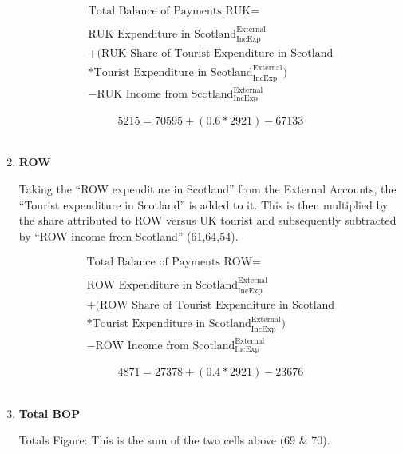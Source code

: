 \begin{enumerate}
\begin{equation}
\begin{split}
\text{Total Balance of Payments RUK} =  \\ \\
\text{RUK Expenditure in Scotland}^\text{External}_\text{IncExp}\\
+(\text{RUK Share of Tourist Expenditure in Scotland}\\
*\text{Tourist  Expenditure in Scotland}^\text{External}_\text{IncExp})\\
-\text{RUK Income from Scotland}^\text{External}_\text{IncExp}
\end{split} \label{eq:2.5.73}
\end{equation}

\begin{equation} \nonumber
5215 = 70595+(0.6*2921)-67133
\end{equation}\\


\item \textbf {ROW}

Taking the ``ROW expenditure in Scotland'' from the External Accounts, the ``Tourist expenditure in Scotland'' is added to it. This is then multiplied by the share attributed to ROW versus UK tourist and subsequently subtracted by ``ROW income from Scotland'' (61,64,54). \cite{ONS2010a}

\begin{equation}
\begin{split}
\text{Total Balance of Payments ROW} =  \\ \\
\text{ROW Expenditure in Scotland}^\text{External}_\text{IncExp}\\
+(\text{ROW Share of Tourist Expenditure in Scotland}\\
*\text{Tourist  Expenditure in Scotland}^\text{External}_\text{IncExp})\\
-\text{ROW Income from Scotland}^\text{External}_\text{IncExp}
\end{split} \label{eq:2.5.74}
\end{equation}

\begin{equation} \nonumber
4871 = 27378+(0.4*2921)-23676
\end{equation}\\


\item \textbf {Total BOP}

Totals Figure: This is the sum of the two cells above (69 \& 70).


\end{enumerate}
